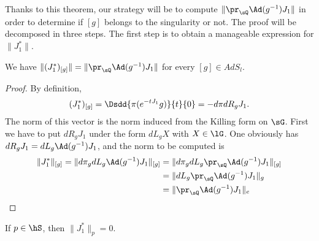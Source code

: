Thanks to this theorem, our strategy will be to compute $\| \pr_{\sQ}\Ad(g^{-1})J_1 \|$ in order to determine if $[g]$ belongs to the singularity or not. The proof will be decomposed in three steps. The first step is to obtain a manageable expression for $\| J_1^* \|$.

\begin{lemma}        \label{LONGLemExpressionCoolNormJUn}
	We have $\| (J_1^*)_{[g]} \|=\| \pr_{\sQ}\Ad(g^{-1})J_1 \|$ for every $[g]\in AdS_l$.
\end{lemma}




\begin{proof}
	By definition,
	\begin{equation}
		(J_1^*)_{[g]}=\Dsdd{ \pi( e^{-tJ_1}g) }{t}{0}=-d\pi dR_g J_1.
	\end{equation}
	The norm of this vector is the norm induced from the Killing form on $\sG$\cite{Kerin}. First we have to put $dR_g J_1$ under the form $dL_g X$ with $X\in \lG$. One obviously has $dR_g J_1=dL_g\Ad(g^{-1})J_1$, and the norm to be computed is
	\begin{equation}
		\begin{aligned}[]
			\| J_1^* \|_{[g]}=\| d\pi_gdL_g\Ad(g^{-1})J_1\|_{[g]} & =  \|  d\pi_gdL_g\pr_{\sQ}\Ad(g^{-1})J_1\|_{[g]} \\
			                                                      & = \| dL_g\pr_{\sQ}\Ad(g^{-1})J_1 \|_{g}          \\
			                                                      & =\| \pr_{\sQ}\Ad(g^{-1})J_1 \|_e
		\end{aligned}
	\end{equation}
\end{proof}


\begin{proposition}        \label{LONGPropPtpsSjzero}
	If $p\in\hS$, then $\| J_1^* \|_p=0$.
\end{proposition}

